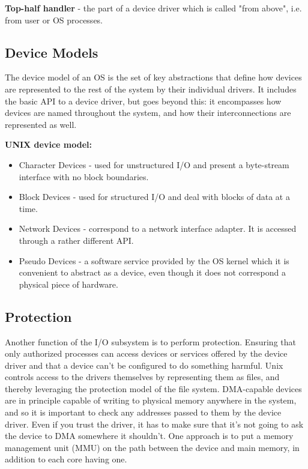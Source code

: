\textbf{Top-half handler} - the part of a device driver which is called "from above", i.e. from user or OS processes.

\subsection{Device Models}

The device model of an OS is the set of key abstractions that define how devices are represented to the rest of the system by their individual drivers. It includes the basic API to a device driver, but goes beyond this: it encompasses how devices are named throughout the system, and how their interconnections are represented as well. \medskip

\textbf{UNIX device model:}
\begin{itemize}
	\item Character Devices - used for unstructured I/O and present a byte-stream interface with no block boundaries.
	\item Block Devices - used for structured I/O and deal with blocks of data at a time.
	\item Network Devices - correspond to a network interface adapter. It is accessed through a rather different API.
	\item Pseudo Devices - a software service provided by the OS kernel which it is convenient to abstract as a device, even though it does not correspond a physical piece of hardware.
\end{itemize}

\subsection{Protection}

Another function of the I/O subsystem is to perform protection. Ensuring that only authorized processes can access devices or services offered by the device driver and that a device can't be configured to do something harmful. Unix controls access to the drivers themselves by representing them as files, and thereby leveraging the protection model of the file system. DMA-capable devices are in principle capable of writing to physical memory anywhere in the system, and so it is important to check any addresses passed to them by the device driver. Even if you trust the driver, it has to make sure that it’s not going to ask the device to DMA somewhere it shouldn’t. One approach is to put a memory management unit (MMU) on the path between the device and main memory, in addition to each core having one.
